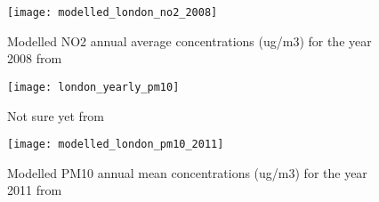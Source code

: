\begin{figure}[H]
\centering
\texttt{[image: modelled\_london\_no2\_2008]}
\caption{Modelled NO2 annual average concentrations (ug/m3) for the year 2008 from \cite{GreaterLondonAuthorityGLA2010}}
\label{fig:modelled_london_no2_2008}
\end{figure}

\begin{figure}[H]
\centering
\texttt{[image: london\_yearly\_pm10]}
\caption{Not sure yet from \cite{GreaterLondonAuthorityGLA2010}}
\label{fig:london_yearly_pm10}
\end{figure}

\begin{figure}[H]
\centering
\texttt{[image: modelled\_london\_pm10\_2011]}
\caption{Modelled PM10 annual mean concentrations (ug/m3) for the year 2011 from \cite{GreaterLondonAuthorityGLA2010}}
\label{fig:modelled_london_pm10_2011}
\end{figure}